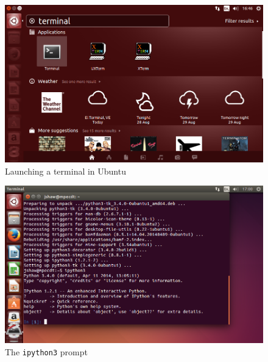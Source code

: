 \documentclass[a4paper,twoside]{memoir}
\newcommand{\shellcmd}{\texttt}
\begin{document}
\begin{figure}
	\includegraphics[width=\textwidth]{terminal.png}
	\caption{Launching a terminal in Ubuntu}
	\label{fig:term}
\end{figure}

\begin{figure}
	\includegraphics[width=\textwidth]{ipython3.png}
	\caption{The \shellcmd{ipython3} prompt}
	\label{fig:ipython3}
\end{figure}
\end{document}
